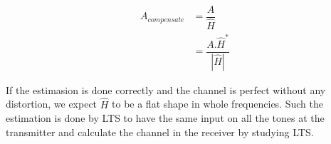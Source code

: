 \begin{equation} \label{channel_Comp}
\begin{split}
A_{compensate} & = \dfrac{A}{\hat{H}}\\
&= \dfrac{A.{\hat{H}}^*}{|\hat{H}|}
\end{split}
\end{equation}

If the estimasion is done correctly and the channel is perfect without any distortion, we expect $\hat{H}$ to be a flat shape in whole frequencies. Such the estimation is done by LTS to have the same input on all the tones at the transmitter and calculate the channel in the receiver by studying LTS.\\
